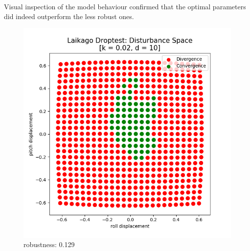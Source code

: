     Visual inspection of the model behaviour confirmed that the optimal parameters did indeed outperform the less robust ones. 



    \begin{figure}[h]
        \centering
        \begin{minipage}{0.33\textwidth}
            \centering
            \includegraphics[width=\textwidth]{figures/droptest_ds_bad_correct.png} \\
            \small robustness: 0.129 %
        \end{minipage}\hfill
        \begin{minipage}{0.33\textwidth}
            \centering

\end{minipage}
\end{figure}
